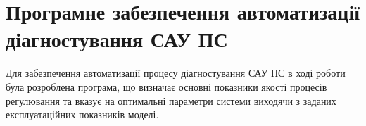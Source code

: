 \section{Програмне забезпечення автоматизації діагностування САУ ПС}

Для забезпечення автоматизації процесу діагностування САУ ПС в ході 
роботи була розроблена програма, що визначає основні показники якості 
процесів регулювання та вказує на оптимальні параметри системи виходячи 
з заданих експлуатаційних показників моделі. 



